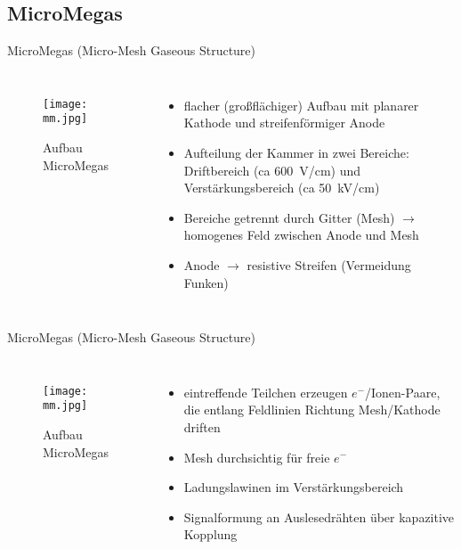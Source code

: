 \subsection[]{MicroMegas}

\begin{frame}{MicroMegas (Micro-Mesh Gaseous Structure)}
    \begin{columns}[T]
			\begin{figure}[htbp]
			  \centering
			  \texttt{[image: mm.jpg]}
			  \caption{Aufbau MicroMegas}
			\end{figure}
			
	    	\begin{itemize}
	    	  \item flacher (großflächiger) Aufbau mit planarer Kathode und streifenförmiger Anode
	    	  \item Aufteilung der Kammer in zwei Bereiche: Driftbereich (ca 600~V/cm) und
	    	  Verstärkungsbereich (ca 50~kV/cm)
	    	  \item Bereiche getrennt durch Gitter (Mesh) $\rightarrow$ homogenes Feld zwischen Anode
	    	  und Mesh
	    	  \item Anode $\rightarrow$ resistive Streifen (Vermeidung Funken)
			\end{itemize}
			
    \end{columns}
\end{frame}


\begin{frame}{MicroMegas (Micro-Mesh Gaseous Structure)}
    \begin{columns}[T]
			\begin{figure}[htbp]
			  \centering
			  \texttt{[image: mm.jpg]}
			  \caption{Aufbau MicroMegas}
			\end{figure}
			
	    	\begin{itemize}
	    	  \item eintreffende Teilchen erzeugen $e^-$/Ionen-Paare, die entlang Feldlinien Richtung
	    	  Mesh/Kathode driften
	    	  \item Mesh durchsichtig für freie $e^-$
	    	  \item Ladungslawinen im Verstärkungsbereich
	    	  \item Signalformung an Auslesedrähten über kapazitive Kopplung
			\end{itemize}
			
    \end{columns}
\end{frame}


